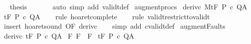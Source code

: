 \begin{isabellebody}
\ \isamarkupfalse%
\ {\isacharquery}thesis\isanewline
\ \ \ \ \ \isamarkupfalse%
\ {\isacharparenleft}auto\ simp\ add{\isacharcolon}\ validt{\isacharunderscore}def{\isacharparenright}\isanewline
{}\isamarkupfalse%
%
\endisatagproof
{\isafoldproof}%
%
\isadelimproof
\isanewline
%
\endisadelimproof
\isanewline
\isanewline
{}\isamarkupfalse%
\ augment{\isacharunderscore}procs{\isacharcolon}\isanewline
{}\ deriv{\isacharunderscore}c{\isacharcolon}\ {\isachardoublequoteopen}{\isasymGamma}{\isacharbar}\isactrlbsub M\isactrlesub {\isacharcomma}{\isacharbraceleft}{\isacharbraceright}{\isasymturnstile}\isactrlsub t\isactrlbsub {\isacharslash}F\isactrlesub \ P\ c\ Q{\isacharcomma}A{\isachardoublequoteclose}\isanewline
{}\ {\isachardoublequoteopen}{\isasymGamma}{\isacharcomma}{\isacharbraceleft}{\isacharbraceright}{\isasymturnstile}\isactrlsub t\isactrlbsub {\isacharslash}F\isactrlesub \ P\ c\ Q{\isacharcomma}A{\isachardoublequoteclose}\isanewline
%
\isadelimproof
\ \ %
\endisadelimproof
%
\isatagproof
{}\isamarkupfalse%
\ {\isacharparenleft}rule\ hoaret{\isacharunderscore}complete{\isacharparenright}\isanewline
\ \ \isamarkupfalse%
\ {\isacharparenleft}rule\ validt{\isacharunderscore}restrict{\isacharunderscore}to{\isacharunderscore}validt{\isacharparenright}\isanewline
\ \ \isamarkupfalse%
\ {\isacharparenleft}insert\ hoaret{\isacharunderscore}sound\ {\isacharbrackleft}OF\ deriv{\isacharunderscore}c{\isacharbrackright}{\isacharparenright}\isanewline
\ \ \isamarkupfalse%
\ {\isacharparenleft}simp\ add{\isacharcolon}\ cvalidt{\isacharunderscore}def{\isacharparenright}%
\endisatagproof
{\isafoldproof}%
%
\isadelimproof
%
\endisadelimproof
%
\isamarkuptrue%
\isamarkupfalse%
\ augment{\isacharunderscore}Faults{\isacharcolon}\isanewline
{}\ deriv{\isacharunderscore}c{\isacharcolon}\ {\isachardoublequoteopen}{\isasymGamma}{\isacharcomma}{\isacharbraceleft}{\isacharbraceright}{\isasymturnstile}\isactrlsub t\isactrlbsub {\isacharslash}F\isactrlesub \ P\ c\ Q{\isacharcomma}A{\isachardoublequoteclose}\isanewline
{}\ F{\isacharcolon}\ {\isachardoublequoteopen}F\ {\isasymsubseteq}\ F{\isacharprime}{\isachardoublequoteclose}\isanewline
{}\ {\isachardoublequoteopen}{\isasymGamma}{\isacharcomma}{\isacharbraceleft}{\isacharbraceright}{\isasymturnstile}\isactrlsub t\isactrlbsub {\isacharslash}F{\isacharprime}\isactrlesub \ P\ c\ Q{\isacharcomma}A{\isachardoublequoteclose}\isanewline

\end{isabellebody}
